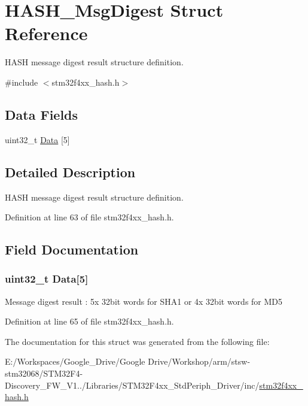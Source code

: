 \hypertarget{struct_h_a_s_h___msg_digest}{\section{H\-A\-S\-H\-\_\-\-Msg\-Digest Struct Reference}
\label{struct_h_a_s_h___msg_digest}
}


H\-A\-S\-H message digest result structure definition.  




{\ttfamily \#include $<$stm32f4xx\-\_\-hash.\-h$>$}

\subsection*{Data Fields}
\begin{DoxyCompactItemize}
\item 
uint32\-\_\-t \hyperlink{struct_h_a_s_h___msg_digest_a22779bbc5e6746dbf4e4b065dc08f0a5}{Data} \mbox{[}5\mbox{]}
\end{DoxyCompactItemize}


\subsection{Detailed Description}
H\-A\-S\-H message digest result structure definition. 

Definition at line 63 of file stm32f4xx\-\_\-hash.\-h.



\subsection{Field Documentation}
\hypertarget{struct_h_a_s_h___msg_digest_a22779bbc5e6746dbf4e4b065dc08f0a5}{
\subsubsection[{Data}]{\setlength{\rightskip}{0pt plus 5cm}uint32\-\_\-t Data\mbox{[}5\mbox{]}}}\label{struct_h_a_s_h___msg_digest_a22779bbc5e6746dbf4e4b065dc08f0a5}
Message digest result \-: 5x 32bit words for S\-H\-A1 or 4x 32bit words for M\-D5 

Definition at line 65 of file stm32f4xx\-\_\-hash.\-h.



The documentation for this struct was generated from the following file\-:\begin{DoxyCompactItemize}
\item 
E\-:/\-Workspaces/\-Google\-\_\-\-Drive/\-Google Drive/\-Workshop/arm/stsw-\/stm32068/\-S\-T\-M32\-F4-\/\-Discovery\-\_\-\-F\-W\-\_\-\-V1../\-Libraries/\-S\-T\-M32\-F4xx\-\_\-\-Std\-Periph\-\_\-\-Driver/inc/\hyperlink{stm32f4xx__hash_8h}{stm32f4xx\-\_\-hash.\-h}\end{DoxyCompactItemize}
